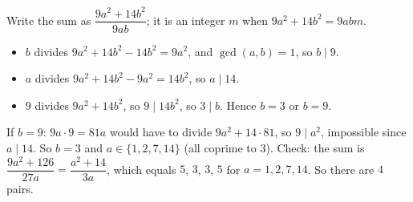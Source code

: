 Write the sum as $\dfrac{9a^2+14b^2}{9ab}$; it is an integer $m$ when $9a^2+14b^2=9abm$.
\begin{itemize}
\item $b$ divides $9a^2+14b^2-14b^2=9a^2$, and $\gcd(a,b)=1$, so $b\mid9$.
\item $a$ divides $9a^2+14b^2-9a^2=14b^2$, so $a\mid14$.
\item $9$ divides $9a^2+14b^2$, so $9\mid14b^2$, so $3\mid b$. Hence $b=3$ or $b=9$.
\end{itemize}
If $b=9$: $9a\cdot9=81a$ would have to divide $9a^2+14\cdot81$, so $9\mid a^2$, impossible since $a\mid14$. So $b=3$ and $a\in\{1,2,7,14\}$ (all coprime to $3$). Check: the sum is $\dfrac{9a^2+126}{27a}=\dfrac{a^2+14}{3a}$, which equals $5$, $3$, $3$, $5$ for $a=1,2,7,14$. So there are $\boxed{4}$ pairs.
